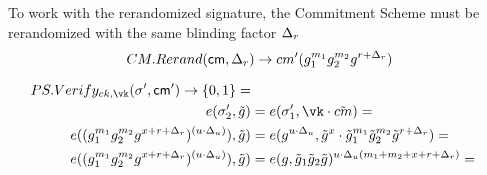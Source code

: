 To work with the rerandomized signature, the Commitment Scheme must be rerandomized with the same blinding factor $\Delta_r$ 
\[
    CM.Rerand(\mathsf{cm}, \Delta_r) \to cm'(g_1^{m_1} g_2^{m_2}g^{r+\Delta_r})
\]


\[
\begin{aligned}
    PS.Verify_{ck,\vk}(\sigma', \cm') \to \bit =\\
    e(\sigma_2', \tilg) &= e(\sigma_1', \vk \cdot \tilcm) = \\
    e((g_1^{m_1} g_2^{m_2}g^{x+r + \rd})^{(u \cdot \ud )}), \tilg) &= e(g^{u \cdot \ud}, \tilg^x \cdot \tilg_1^{m_1} \tilg_2^{m_2}\tilg^{r + \rd}) = \\
    e((g_1^{m_1} g_2^{m_2}g^{x+r + \rd})^{(u \cdot \ud )}), \tilg) &= e(g, \tilg_1 \tilg_2 \tilg)^{{u \cdot \ud}(m_1 + m_2 + x + r + \rd)} = \\
 \end{aligned}
\] 





















